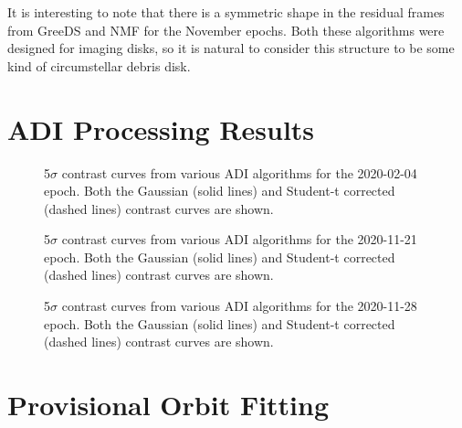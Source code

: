 \documentclass[twocolumn]{aastex631}
\begin{document}
It is interesting to note that there is a symmetric shape in the residual frames from GreeDS and NMF for the November epochs. Both these algorithms were designed for imaging disks, so it is natural to consider this structure to be some kind of circumstellar debris disk.


\begin{acknowledgments}

\end{acknowledgments}


{}


\appendix

\section{ADI Processing Results} \label{sec:adi-results}




\begin{figure*}
    \caption{5$\sigma$ contrast curves from various ADI algorithms for the 2020-02-04 epoch. Both the Gaussian (solid lines) and Student-t corrected (dashed lines) contrast curves are shown.}
\end{figure*}

\begin{figure*}
    \caption{5$\sigma$ contrast curves from various ADI algorithms for the 2020-11-21 epoch. Both the Gaussian (solid lines) and Student-t corrected (dashed lines) contrast curves are shown.}
\end{figure*}

\begin{figure*}
    \caption{5$\sigma$ contrast curves from various ADI algorithms for the 2020-11-28 epoch. Both the Gaussian (solid lines) and Student-t corrected (dashed lines) contrast curves are shown.}
\end{figure*}

\section{Provisional Orbit Fitting} \label{sec:orbits}
\end{document}
